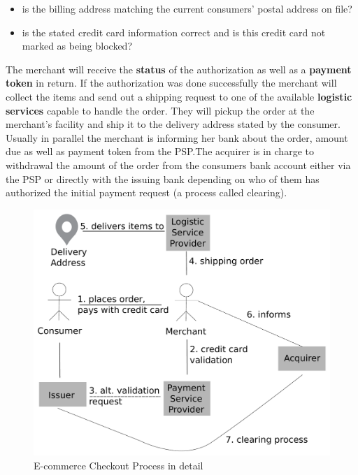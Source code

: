 \begin{itemize}
    \item is the billing address matching the current consumers' postal address on file?
    \item is the stated credit card information correct and is this credit card not marked as being blocked?
\end{itemize}

The merchant will receive the \textbf{status} of the authorization as well as a \textbf{payment token} in return. If the authorization was done successfully the merchant will collect the items and send out a shipping request to one of the available \textbf{logistic services} capable to handle the order. They will pickup the order at the merchant's facility and ship it to the delivery address stated by the consumer. Usually in parallel the merchant is informing her bank about the order, amount due as well as payment token from the PSP.\@ The acquirer is in charge to withdrawal the amount of the order from the consumers bank account either via the PSP or directly with the issuing bank depending on who of them has authorized the initial payment request (a process called clearing).\@

\begin{figure}[H]
	\centering
		\includegraphics[width=0.8\columnwidth]{images/e-commerce-checkout-process.pdf}
	\caption{E-commerce Checkout Process in detail}
\label{fig:images_ecommerce_checkout_process}
\end{figure}

